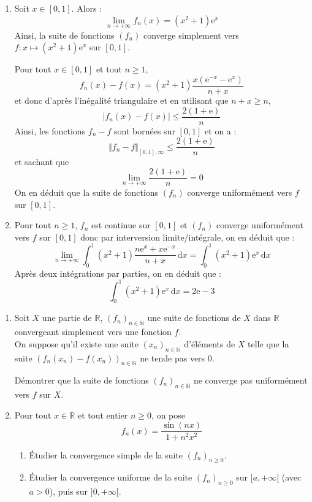 \documentclass[a4paper,10pt]{report}
\begin{document}
\corr \begin{enumerate}
\item Soit $x \in \left[ {0,1} \right]$. Alors :
$$\lim\limits_{n\to +\infty}^{}f_n (x)=(x^2  + 1){\mathrm{e}}^x $$
Ainsi, la suite de fonctions $(f_n)$ converge simplement vers $f:x \mapsto (x^2  + 1){\mathrm{e}}^x $ sur $\left[ {0,1} \right]$.
\medskip

\noindent Pour tout $x\in \left[ 0,1\right]$ et tout $n \geq 1$, 
$$f_n (x) - f(x) = (x^2  + 1)\dfrac{{x({\mathrm{e}}^{ - x}  - {\mathrm{e}}^x )}}{{n + x}}$$
et donc d'après l'inégalité triangulaire et en utilisant que $n+x \geq n$,
$$\left| {f_n (x) - f(x)} \right| \leqslant \dfrac{{2(1+\textrm{e})}}{n}$$
Ainsi, les fonctions $f_n-f$ sont bornées sur $[0,1]$ et on a :
$$ \Vert f_n -f \Vert_{[0,1], \infty} \leq \dfrac{{2(1+\textrm{e})}}{n}$$
et sachant que 
$$ \lim_{n \rightarrow + \infty} \dfrac{{2(1+\textrm{e})}}{n} = 0 $$
On en déduit que la suite de fonctions $(f_n)$ converge uniformément vers $f$ sur $\left[ {0,1} \right]$.
\item Pour tout $n \geq 1$, $f_n$ est continue sur $[0,1]$ et $(f_n)$ converge uniformément vers $f$ sur $\left[ {0,1} \right]$ donc par interversion limite/intégrale, on en déduit que :
$$\mathop {\lim }\limits_{n \to  + \infty } \displaystyle\int_0^1 {(x^2  + 1)\dfrac{{n{\mathrm{e}}^x  + x{\mathrm{e}}^{ - x} }}{{n + x}}\,{\mathrm{d}}x}  = \displaystyle\int_0^1 {(x^2  + 1){\mathrm{e}}^x \,{\mathrm{d}}x} $$
Après deux intégrations par parties, on en déduit que :
$$\displaystyle\int_0^1 {(x^2  + 1){\mathrm{e}}^x \,{\mathrm{d}}x}  = 2{\mathrm{e}} - 3$$
\end{enumerate}

\begin{Exa} \begin{enumerate}
\item Soit $X$ une partie de $\mathbb{R}$, $\left( f_{n}\right) _{n\in \mathbb{N}}$ une suite de fonctions de $X$ dans $\mathbb{R}$ convergeant simplement vers une fonction $f$. \\
On suppose qu'il existe une suite $\left( x_{n}\right)_{n\in \mathbb{N}}$ d'\'{e}l\'{e}ments de $X$ telle que la suite $\left( f_{n}(x_{n})-f\left( x_{n}\right) \right) _{n\in \mathbb{N}}$ ne tende pas vers $0$. \bigskip

D\'{e}montrer que la suite de fonctions $\left( f_{n}\right) _{n\in \mathbb{N}}$ ne converge pas uniform\'{e}ment vers $f$ sur $X$.

\item Pour tout $x\in\mathbb{R}$ et tout entier $n \geq 0$, on pose 
$$f_{n}(x) =\dfrac{\sin \left( nx\right) }{1+n^{2}x^{2}}$$
	\begin{enumerate}
	\item \'Etudier la convergence simple de la suite $\left( f_{n}\right)_{n \geq 0}$.
	\item \'Etudier la convergence uniforme de la suite $\left( f_{n}\right)_{n \geq 0}$ sur $[a,+\infty[$ (avec $a>0$),  puis sur $]0,+\infty[$.
	\end{enumerate}
\end{enumerate}
\end{Exa}
\end{document}
